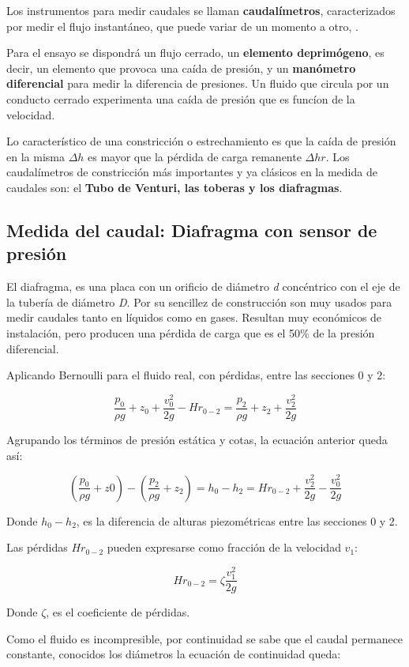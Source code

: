 Los instrumentos para medir caudales se llaman \textbf{caudalímetros},
caracterizados por medir el flujo instantáneo, que puede variar de un
momento a otro, \cite{Mataix82}.


Para el ensayo se dispondrá un flujo cerrado, un \textbf{elemento
deprimógeno}, es decir, un elemento que provoca una caída de presión, y
un \textbf{manómetro diferencial} para medir la diferencia de presiones.
Un fluido que circula por un conducto cerrado experimenta una caída de
presión que es funcíon de la velocidad.

Lo característico de una constricción o estrechamiento es que la caída
de presión en la misma \(\Delta h\) es mayor que la pérdida de carga
remanente \(\Delta hr\). Los caudalímetros de constricción más
importantes y ya clásicos en la medida de caudales son: el \textbf{Tubo de
Venturi, las toberas y los diafragmas}.

\subsection{Medida del caudal: Diafragma con sensor de
presión}\label{header-n54}

El diafragma, es una placa con un orificio de diámetro \emph{d}
concéntrico con el eje de la tubería de diámetro \emph{D}. Por su
sencillez de construcción son muy usados para medir caudales tanto en
líquidos como en gases. Resultan muy económicos de instalación, pero
producen una pérdida de carga que es el 50\% de la presión diferencial.

Aplicando Bernoulli para el fluido real, con pérdidas, entre las
secciones 0 y 2:


\[\frac{p_{0}}{\rho g}+z_{0}+\frac{v_{0}^2}{2g}-Hr_{0-2}=\frac{p_{2}}{\rho g}+z_{2}+\frac{v_{2}^2}{2g}\]


Agrupando los términos de presión estática y cotas, la ecuación anterior
queda así:

\[(\frac{p_{0}}{\rho g}+z{0})-(\frac{p_{2}}{\rho g}+z_{2})=h_{0}-h_{2}=Hr_{0-2}+\frac{v_{2}^2}{2g}-\frac{v_{0}^2}{2g}\]

Donde \(h_0-h_{2}\), es la diferencia de alturas piezométricas entre las
secciones 0 y 2.

Las pérdidas \(Hr_{0-2}\) pueden expresarse como fracción de la
velocidad \(v_1\):

\[Hr_{0-2}=\zeta \frac{v_{1}^2}{2g}\]

Donde \(\zeta\), es el coeficiente de pérdidas.

Como el fluido es incompresible, por continuidad se sabe que el caudal
permanece constante, conocidos los diámetros la ecuación de continuidad
queda:

